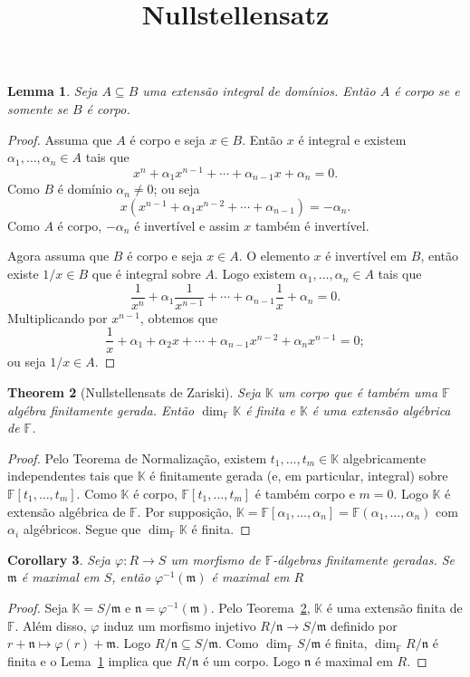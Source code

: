 \documentclass[12pt]{amsart}
\newcommand{\m}{\mathfrak m}
\newcommand{\n}{\mathfrak n}
\newcommand{\F}{\mathbb F}
\newcommand{\K}{\mathbb K}
\newtheorem{theorem}{Theorem}
\newtheorem{corollary}[theorem]{Corollary}
\newtheorem{lemma}[theorem]{Lemma}
\theoremstyle{definition}
\begin{document}
\title{Nullstellensatz}
\maketitle

\begin{lemma}\label{lem:corpos}
    Seja $A\subseteq B$ uma extensão integral de domínios. Então $A$ é corpo se e somente se $B$ é corpo.
\end{lemma}
\begin{proof}
    Assuma que $A$ é corpo e seja $x\in B$. Então $x$ é integral e existem $\alpha_1,\ldots,\alpha_n\in A$ 
    tais que 
    \[ 
        x^n+\alpha_1x^{n-1}+\cdots+\alpha_{n-1}x+\alpha_n=0. 
    \]
    Como $B$ é domínio $\alpha_n\neq 0$;
    ou seja 
    \[
        x(x^{n-1}+\alpha_1x^{n-2}+\cdots+\alpha_{n-1})=-\alpha_n.
    \]    
    Como $A$ é corpo, $-\alpha_n$ é invertível e assim $x$ também é invertível. 

    Agora assuma que $B$ é corpo e seja $x\in A$. O elemento $x$ é invertível em $B$, então existe $1/x\in B$
    que é integral sobre $A$. Logo existem $\alpha_1,\ldots,\alpha_n\in A$
    tais que 
    \[
        \frac 1{x^n}+\alpha_1\frac 1{x^{n-1}}+\cdots+\alpha_{n-1}\frac 1x+\alpha_n=0.
    \]
    Multiplicando por $x^{n-1}$, obtemos que 
    \[
        \frac 1x+\alpha_1+\alpha_2x+\cdots+\alpha_{n-1}x^{n-2}+\alpha_nx^{n-1}=0;
    \]
    ou seja $1/x\in A$.
\end{proof}

\begin{theorem}[Nullstellensats de Zariski]\label{th:zariski}
    Seja $\K$ um corpo que é também uma $\F$ algébra finitamente gerada. Então $\dim_\F\K$ é finita e $\K$ é uma extensão algébrica de $\F$. 
\end{theorem}
\begin{proof}
    Pelo Teorema de Normalização, existem $t_1,\ldots,t_m\in \K$ algebricamente independentes tais que 
    $\K$ é finitamente gerada (e, em particular, integral) sobre $\F[t_1,\ldots,t_m]$. Como $\K$ é corpo,  
    $\F[t_1,\ldots,t_m]$ é também corpo e $m=0$. Logo $\K$ é extensão algébrica de $\F$. Por supposição, 
    $\K=\F[\alpha_1,\ldots,\alpha_n]=\F(\alpha_1,\ldots,\alpha_n)$ com $\alpha_i$ algébricos. Segue que 
    $\dim_\F\K$ é finita.
\end{proof}

\begin{corollary}\label{cor:max}
    Seja $\varphi:R\to S$ um morfismo de $\F$-álgebras finitamente geradas. Se $\m$ é maximal em 
    $S$, então $\varphi^{-1}(\m)$ é maximal em $R$
\end{corollary}
\begin{proof}
    Seja $\K=S/\m$ e $\n=\varphi^{-1}(\m)$. Pelo Teorema~\ref{th:zariski}, $\K$ é uma extensão finita de $\F$. Além disso,
    $\varphi$ induz um morfismo injetivo $R/\n\to S/\m$ definido por $r+\n\mapsto \varphi(r)+\m$. 
    Logo $R/\n\subseteq S/\m$. Como $\dim_\F S/\m$ é finita, $\dim_{\F}R/\n$ é finita e 
    o Lema~\ref{lem:corpos} implica que $R/\n$ é um corpo. Logo $\n$ é maximal em $R$. 
\end{proof}
\end{document}
